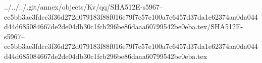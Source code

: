 ../../../.git/annex/objects/Kv/qq/SHA512E-s5967--ec5bb3ae3fdcc3f36d272d079183f88f016e79f7c57e100a7c6457d37da1e62374aa0da044d44d685084667de2de04db30c1fcb296be86daaa60799542be0eba.tex/SHA512E-s5967--ec5bb3ae3fdcc3f36d272d079183f88f016e79f7c57e100a7c6457d37da1e62374aa0da044d44d685084667de2de04db30c1fcb296be86daaa60799542be0eba.tex
